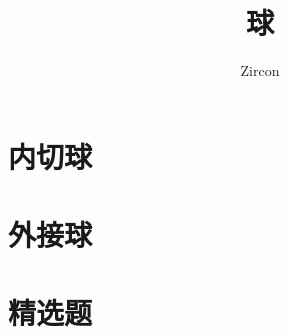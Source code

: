 \documentclass[oneside]{book}
\def\notetitle{球}
\def\noteauthor{Zircon}
\def\notedate{}
\begin{document}
\title{\heiti \LARGE \notetitle \vspace*{8\baselineskip}}
\author{\noteauthor}
\date{\notedate}

\maketitle
\newpage

\setcounter{tocdepth}{1}
\tableofcontents
\newpage

\part{内切球}


\part{外接球}





\part{精选题}

\end{document}
